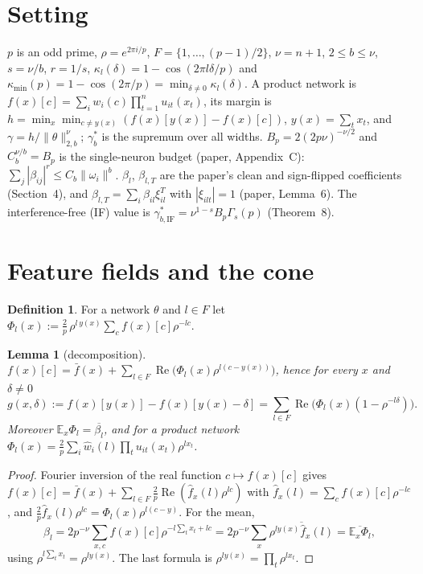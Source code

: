 \documentclass[11pt]{article}
\newtheorem{lemma}[theorem]{Lemma}
\theoremstyle{definition}
\newtheorem{definition}[theorem]{Definition}
\newcommand{\E}{\mathbb{E}}
\renewcommand{\Re}{\operatorname{Re}}
\begin{document}
\section{Setting}
$p$ is an odd prime, $\rho=e^{2\pi i/p}$, $F=\{1,\dots,(p-1)/2\}$, $\nu=n+1$, $2\le b\le\nu$, $s=\nu/b$, $r=1/s$,
$\kappa_l(\delta)=1-\cos(2\pi l\delta/p)$ and $\kappa_{\min}(p)=1-\cos(2\pi/p)=\min_{\delta\neq0}\kappa_l(\delta)$.
A product network is $f(x)[c]=\sum_i w_i(c)\prod_{t=1}^n u_{it}(x_t)$, its margin is
$h=\min_x\min_{c\ne y(x)}(f(x)[y(x)]-f(x)[c])$, $y(x)=\sum_t x_t$, and $\gamma=h/\|\theta\|^\nu_{2,b}$; $\gamma^*_b$ is the
supremum over all widths.  $B_p=2(2p\nu)^{-\nu/2}$ and $C_b^{\nu/b}=B_p$ is the single-neuron budget
(paper, Appendix~C): $\sum_{j}|\beta_{ij}|^{r}\le C_b\|\omega_i\|^b$.  $\beta_l$, $\beta_{l,T}$ are the paper's clean and
sign-flipped coefficients (Section~4), and $\beta_{l,T}=\sum_i\beta_{il}\xi_{il}^{T}$ with $|\xi_{ilt}|=1$
(paper, Lemma~6).  The interference-free (IF) value is $\gamma^*_{b,\mathrm{IF}}=\nu^{1-s}B_p\Gamma_s(p)$ (Theorem~8).

\section{Feature fields and the cone}
\begin{definition}
For a network $\theta$ and $l\in F$ let
$\Phi_l(x):=\frac2p\,\rho^{l\,y(x)}\sum_{c}f(x)[c]\rho^{-lc}$.
\end{definition}

\begin{lemma}[decomposition]\label{lem:dec}
$f(x)[c]=\bar f(x)+\sum_{l\in F}\Re\big(\Phi_l(x)\rho^{l(c-y(x))}\big)$, hence for every $x$ and $\delta\ne0$
\[
g(x,\delta):=f(x)[y(x)]-f(x)[y(x)-\delta]=\sum_{l\in F}\Re\big(\Phi_l(x)(1-\rho^{-l\delta})\big).
\]
Moreover $\E_x\Phi_l=\overline{\beta_l}$, and for a product network
$\Phi_l(x)=\frac2p\sum_i\hat w_i(l)\prod_t u_{it}(x_t)\rho^{lx_t}$.
\end{lemma}
\begin{proof}
Fourier inversion of the real function $c\mapsto f(x)[c]$ gives
$f(x)[c]=\bar f(x)+\sum_{l\in F}\frac2p\Re(\hat f_x(l)\rho^{lc})$ with $\hat f_x(l)=\sum_cf(x)[c]\rho^{-lc}$, and
$\frac2p\hat f_x(l)\rho^{lc}=\Phi_l(x)\rho^{l(c-y)}$.  For the mean,
\[\beta_l=2p^{-\nu}\sum_{x,c}f(x)[c]\rho^{-l\sum_tx_t+lc}=2p^{-\nu}\sum_x\overline{\rho^{ly(x)}\hat f_x(l)}=\overline{\E_x\Phi_l},\]
using $\rho^{l\sum_t x_t}=\rho^{ly(x)}$.  The last formula is $\rho^{ly(x)}=\prod_t\rho^{lx_t}$.
\end{proof}
\end{document}
